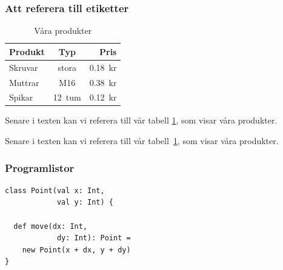 \begin{frame}[fragile,t]
  \frametitle{Att referera till etiketter}
  \vspace{1em}



  \begin{exlatex}
\begin{table}
  \begin{tabular}{lcr}
    Produkt & Typ    & Pris    \\
    \hline
    Skruvar & stora  & 0.18~kr \\
    Muttrar & M16    & 0.38~kr \\
    Spikar  & 12~tum & 0.12~kr
  \end{tabular}
  \caption{Våra produkter}
  \label{produkter}
\end{table}
Senare i texten kan vi referera till vår tabell \ref{produkter}, som visar våra produkter.

Senare i texten kan vi referera till vår tabell~\ref{produkter}, som visar våra produkter.
  \end{exlatex}

\end{frame}

\begin{frame}[fragile,t]
  \frametitle{Programlistor}
  \vspace{.5em}

  \begin{itemize}
  \end{itemize}

  \halfblankline
  \begin{exsrc}
\usepackage{fancyvrb}

\end{exsrc}
\begin{exresult}%
{\small
\begin{verbatim}
class Point(val x: Int, 
            val y: Int) {
  
  def move(dx: Int, 
            dy: Int): Point = 
    new Point(x + dx, y + dy)
}
\end{verbatim}
}  
  \end{exresult}
\end{frame}

